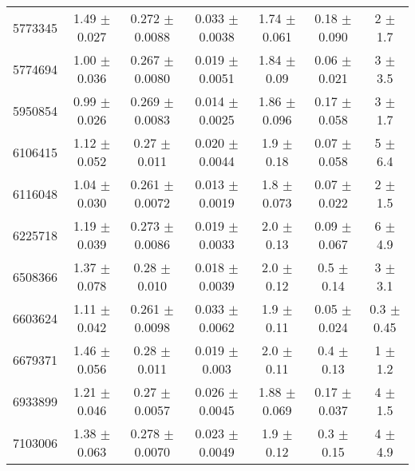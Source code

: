 \documentclass[epjCONF,columns]{svjour} %
\begin{document}
\begin{table*}
\begin{tabular}{c|cccccc}
5773345  &        1.49   $\pm$  0.027    &        0.272  $\pm$  0.0088   &        0.033  $\pm$  0.0038   &        1.74   $\pm$  0.061    &        0.18   $\pm$  0.090    &        2      $\pm$  1.7      \\
5774694  &        1.00   $\pm$  0.036    &        0.267  $\pm$  0.0080   &        0.019  $\pm$  0.0051   &        1.84   $\pm$  0.09     &        0.06   $\pm$  0.021    &        3      $\pm$  3.5      \\
5950854  &        0.99   $\pm$  0.026    &        0.269  $\pm$  0.0083   &        0.014  $\pm$  0.0025   &        1.86   $\pm$  0.096    &        0.17   $\pm$  0.058    &        3      $\pm$  1.7      \\
6106415  &        1.12   $\pm$  0.052    &        0.27   $\pm$  0.011    &        0.020  $\pm$  0.0044   &        1.9    $\pm$  0.18     &        0.07   $\pm$  0.058    &        5      $\pm$  6.4      \\
6116048  &        1.04   $\pm$  0.030    &        0.261  $\pm$  0.0072   &        0.013  $\pm$  0.0019   &        1.8    $\pm$  0.073    &        0.07   $\pm$  0.022    &        2      $\pm$  1.5      \\
6225718  &        1.19   $\pm$  0.039    &        0.273  $\pm$  0.0086   &        0.019  $\pm$  0.0033   &        2.0    $\pm$  0.13     &        0.09   $\pm$  0.067    &        6      $\pm$  4.9      \\
6508366  &        1.37   $\pm$  0.078    &        0.28   $\pm$  0.010    &        0.018  $\pm$  0.0039   &        2.0    $\pm$  0.12     &        0.5    $\pm$  0.14     &        3      $\pm$  3.1      \\
6603624  &        1.11   $\pm$  0.042    &        0.261  $\pm$  0.0098   &        0.033  $\pm$  0.0062   &        1.9    $\pm$  0.11     &        0.05   $\pm$  0.024    &        0.3    $\pm$  0.45     \\
6679371  &        1.46   $\pm$  0.056    &        0.28   $\pm$  0.011    &        0.019  $\pm$  0.003    &        2.0    $\pm$  0.11     &        0.4    $\pm$  0.13     &        1      $\pm$  1.2      \\
6933899  &        1.21   $\pm$  0.046    &        0.27   $\pm$  0.0057   &        0.026  $\pm$  0.0045   &        1.88   $\pm$  0.069    &        0.17   $\pm$  0.037    &        4      $\pm$  1.5      \\
7103006  &        1.38   $\pm$  0.063    &        0.278  $\pm$  0.0070   &        0.023  $\pm$  0.0049   &        1.9    $\pm$  0.12     &        0.3    $\pm$  0.15     &        4      $\pm$  4.9      \\

\end{tabular}
\end{table*}
\end{document}
